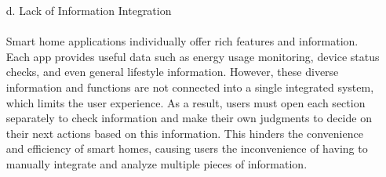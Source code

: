 \documentclass[conference]{IEEEtran}
\begin{document}
\begin{itemize}
    \item [d.] Lack of Information Integration \\ \\ 
    Smart home applications individually offer rich features and information. Each app provides useful data such as energy usage monitoring, device status checks, and even general lifestyle information. However, these diverse information and functions are not connected into a single integrated system, which limits the user experience. As a result, users must open each section separately to check information and make their own judgments to decide on their next actions based on this information. This hinders the convenience and efficiency of smart homes, causing users the inconvenience of having to manually integrate and analyze multiple pieces of information.
    
\end{itemize} 
\end{document}

